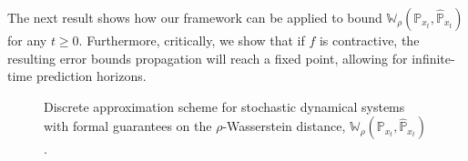 \documentclass[11pt, a4paper, oneside,reqno]{amsart}
\theoremstyle{plain}
\def\prob{\mathbb{P}}
\def\probHat{\hat{\mathbb{P}}}
\def\wasserstein{{\mathbb{W}}}
\def\bsR{{\bm{\mathcal{R}}}}
\def\bsC{{\bm{\mathcal{C}}}}
\begin{document}
The next result shows how our framework can be applied to bound $\wasserstein_\rho(\prob_{x_t}, \probHat_{x_t})$ for any $t\geq 0$. Furthermore, critically, we show that if $f$ is contractive, the resulting error bounds propagation will reach a fixed point, allowing for infinite-time prediction horizons. 
\begin{figure}[t]
    \centering
    \vspace{-3mm}
    \caption{Discrete approximation scheme for stochastic dynamical systems with formal guarantees on the $\rho$-Wasserstein distance, $\wasserstein_\rho(\prob_{x_t}, \probHat_{x_t})$.}
    \label{fig:approximation-scheme-dynamical-systems}
\end{figure}
\end{document}
